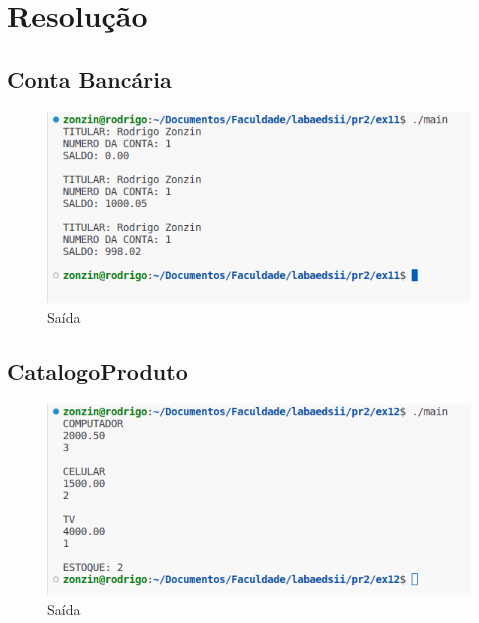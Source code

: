 \section{Resolução}

\subsection{Conta Bancária}

\begin{multicols}{2}
	

	
\end{multicols}	
\newpage
\begin{multicols}{2}
	
\end{multicols}

\begin{figure}[h!]
	\centering
	\includegraphics[width=0.7\linewidth]{q1}
	\caption{Saída}
	\label{fig:q1}
\end{figure}

\subsection{CatalogoProduto}
\begin{multicols}{2}
	
	
\end{multicols}	

\begin{multicols}{2}	
	
\end{multicols}	

\begin{figure}[h!]
	\centering
	\includegraphics[width=0.7\linewidth]{q2}
	\caption{Saída}
	\label{fig:q2}
\end{figure}


